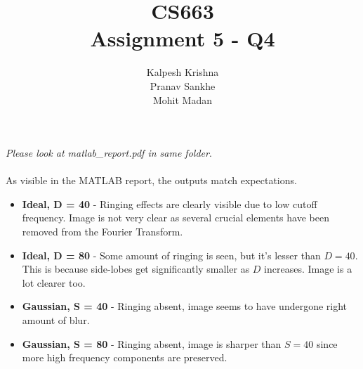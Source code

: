 \documentclass[11pt]{article}
\title{\textbf{CS663 \\ Assignment 5 - Q4}}
\author{Kalpesh Krishna\\ Pranav Sankhe \\ Mohit Madan}
\date{}
\begin{document}
\maketitle
\textit{Please look at matlab\_report.pdf in same folder}.\\\\
As visible in the MATLAB report, the outputs match expectations.
\begin{itemize}
\item \textbf{Ideal, D = 40} - Ringing effects are clearly visible due to low cutoff frequency. Image is not very clear as several crucial elements have been removed from the Fourier Transform.
\item \textbf{Ideal, D = 80} - Some amount of ringing is seen, but it's lesser than $D=40$. This is because side-lobes get significantly smaller as $D$ increases. Image is a lot clearer too.
\item \textbf{Gaussian, S = 40} - Ringing absent, image seems to have undergone right amount of blur.
\item \textbf{Gaussian, S = 80} - Ringing absent, image is sharper than $S = 40$ since more high frequency components are preserved.
\end{itemize}
\end{document}
